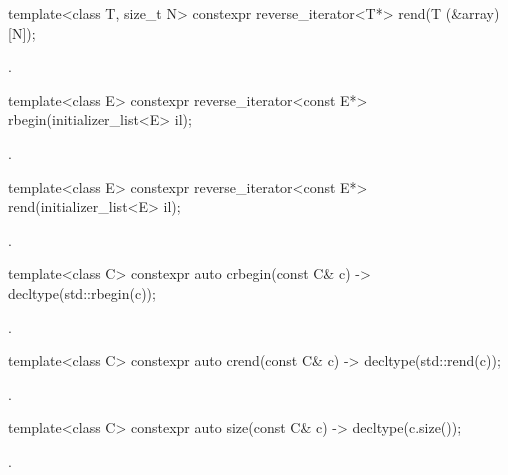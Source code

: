 %
\begin{itemdecl}
template<class T, size_t N> constexpr reverse_iterator<T*> rend(T (&array)[N]);
\end{itemdecl}
\begin{itemdescr}
\pnum
\returns
{}.
\end{itemdescr}

%
\begin{itemdecl}
template<class E> constexpr reverse_iterator<const E*> rbegin(initializer_list<E> il);
\end{itemdecl}
\begin{itemdescr}
\pnum
\returns
{}.
\end{itemdescr}

%
\begin{itemdecl}
template<class E> constexpr reverse_iterator<const E*> rend(initializer_list<E> il);
\end{itemdecl}
\begin{itemdescr}
\pnum
\returns
{}.
\end{itemdescr}

%
\begin{itemdecl}
template<class C> constexpr auto crbegin(const C& c) -> decltype(std::rbegin(c));
\end{itemdecl}
\begin{itemdescr}
\pnum
\returns
{}.
\end{itemdescr}

%
\begin{itemdecl}
template<class C> constexpr auto crend(const C& c) -> decltype(std::rend(c));
\end{itemdecl}
\begin{itemdescr}
\pnum
\returns
{}.
\end{itemdescr}

%
\begin{itemdecl}
template<class C> constexpr auto size(const C& c) -> decltype(c.size());
\end{itemdecl}
\begin{itemdescr}
\pnum
\returns
{}.
\end{itemdescr}

